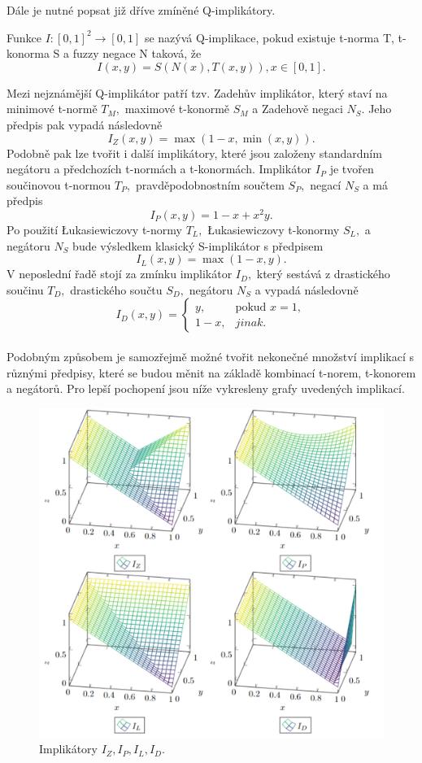 Dále je nutné popsat již dříve zmíněné Q-implikátory.
\begin{definition}
    \cite{Springer}
    Funkce $I: [0,1]^2 \rightarrow [0,1]$ se nazývá Q-implikace, pokud existuje t-norma T, t-konorma S a fuzzy negace N taková, že $$I(x,y) = S(N(x),T(x,y)), x \in [0,1].$$
\end{definition}
Mezi nejznámější Q-implikátor patří tzv. Zadeh\r uv implikátor, který staví na minimové t-normě $T_M,$ maximové t-konormě $S_M$ a Zadehově negaci $N_S$. Jeho předpis pak vypadá následovně $$I_Z(x,y) = \max(1-x, \min(x,y)).$$ Podobně pak lze tvořit i další implikátory, které jsou založeny standardním negátoru a předchozích t-normách a t-konormách. Implikátor $I_P$ je tvořen součinovou t-normou $T_P,$ pravděpodobnostním součtem $S_P,$ negací $N_S$ a má předpis $$I_P(x,y) = 1-x+x^2y.$$  Po použití Łukasiewiczovy t-normy $T_L,$ Łukasiewiczovy t-konormy $S_L,$ a negátoru $N_S$ bude výsledkem klasický S-implikátor s předpisem $$I_L(x,y) = \max(1-x, y).$$ V neposlední řadě stojí za zmínku implikátor $I_D,$ který sestává z drastického součinu $T_D,$ drastického součtu $S_D,$ negátoru $N_S$ a vypadá následovně $$I_D(x,y) = \begin{cases}  y, & \mbox{pokud } x = 1,\\
                1 - x, &  jinak.  \end{cases}$$\\ 
Podobným zp\r usobem je samozřejmě možné tvořit nekonečné množství implikací s r\r uznými předpisy, které se budou měnit na základě kombinací t-norem, t-konorem a negátor\r u. Pro lepší pochopení jsou níže vykresleny grafy uvedených implikací.
\begin{figure}[H]
\caption{Implikátory $I_Z, I_P, I_L, I_D.$}
                \hspace{-1cm}
                \includegraphics[scale=0.65]{template-fig/impl3.pdf}
                \centering
            \end{figure}

